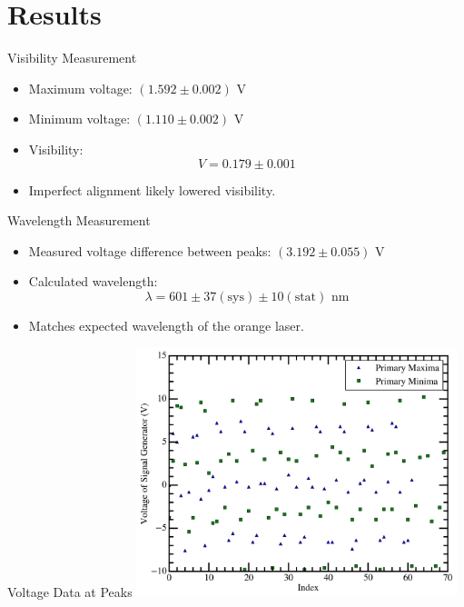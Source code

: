 \documentclass[aspectratio = 169]{beamer}
\begin{document}
\section{Results}
\begin{frame}{Visibility Measurement}
    \begin{itemize}
        \item Maximum voltage: $(1.592\pm0.002)\text{ V}$
        \item Minimum voltage: $(1.110\pm0.002)\text{ V}$
        \item Visibility:
        \[
        V = 0.179\pm0.001
        \]
        \item Imperfect alignment likely lowered visibility.
    \end{itemize}
\end{frame}

\begin{frame}{Wavelength Measurement}
    \begin{itemize}
        \item Measured voltage difference between peaks: $(3.192 \pm 0.055) \text{ V}$
        \item Calculated wavelength:
        \[
        \lambda = 601\pm37(\text{sys})\pm10(\text{stat})\text{ nm}
        \]
        \item Matches expected wavelength of the orange laser.
    \end{itemize}
\end{frame}

\begin{frame}{Voltage Data at Peaks}
    \centering
    \includegraphics[width=0.7\textwidth]{fig/Primary_Maxima_Minima.png}
    \caption{Voltage at primary maxima and minima.}
\end{frame}

\end{document}
